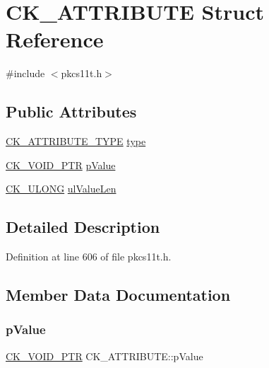 \hypertarget{struct_c_k___a_t_t_r_i_b_u_t_e}{}\section{C\+K\+\_\+\+A\+T\+T\+R\+I\+B\+U\+TE Struct Reference}
\label{struct_c_k___a_t_t_r_i_b_u_t_e}


{\ttfamily \#include $<$pkcs11t.\+h$>$}

\subsection*{Public Attributes}
\begin{DoxyCompactItemize}
\item 
\hyperlink{pkcs11t_8h_ad95456bab28dc2208c2d0e1d01f8ae8a}{C\+K\+\_\+\+A\+T\+T\+R\+I\+B\+U\+T\+E\+\_\+\+T\+Y\+PE} \hyperlink{struct_c_k___a_t_t_r_i_b_u_t_e_a75f2e734f30124dfd27f53010affab07}{type}
\item 
\hyperlink{pkcs11t_8h_ace49359127edfc5665608140005b9a96}{C\+K\+\_\+\+V\+O\+I\+D\+\_\+\+P\+TR} \hyperlink{struct_c_k___a_t_t_r_i_b_u_t_e_af96671d6383ed296ffcb7f7445790e6c}{p\+Value}
\item 
\hyperlink{pkcs11t_8h_a35181858a3b7a0a81f49d180d8f446ef}{C\+K\+\_\+\+U\+L\+O\+NG} \hyperlink{struct_c_k___a_t_t_r_i_b_u_t_e_a645036d609793100f920d589b8d6d33b}{ul\+Value\+Len}
\end{DoxyCompactItemize}


\subsection{Detailed Description}


Definition at line 606 of file pkcs11t.\+h.



\subsection{Member Data Documentation}
\mbox{\label{struct_c_k___a_t_t_r_i_b_u_t_e_af96671d6383ed296ffcb7f7445790e6c}} 
\subsubsection{\texorpdfstring{p\+Value}{pValue}}
{\footnotesize\ttfamily \hyperlink{pkcs11t_8h_ace49359127edfc5665608140005b9a96}{C\+K\+\_\+\+V\+O\+I\+D\+\_\+\+P\+TR} C\+K\+\_\+\+A\+T\+T\+R\+I\+B\+U\+T\+E\+::p\+Value}



